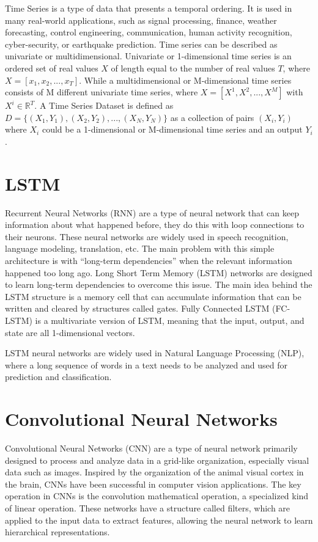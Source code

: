Time Series is a type of data that presents a temporal ordering. It is used in many real-world applications, such as signal processing, finance, weather forecasting, control engineering, communication, human activity recognition, cyber-security, or earthquake prediction. Time series can be described as univariate or multidimensional. Univariate or 1-dimensional time series is an ordered set of real values $X$ of length equal to the number of real values $T$, where $X = [x_1, x_2, ..., x_T]$. While a multidimensional or M-dimensional time series consists of M different univariate time series, where $X = [X^1, X^2, ..., X^M]$ with $X^i \in \mathbb{R}^T$. A Time Series Dataset is defined as $D = \{(X_1, Y_1), (X_2, Y_2), ..., (X_N, Y_N)\}$ as a collection of pairs $(X_i, Y_i)$ where $X_i$ could be a 1-dimensional or M-dimensional time series and an output $Y_i$.

\section{LSTM}
\label{sec:LSTM} 

Recurrent Neural Networks (RNN) are a type of neural network that can keep information about what happened before, they do this with loop connections to their neurons. These neural networks are widely used in speech recognition, language modeling, translation, etc. The main problem with this simple architecture is with “long-term dependencies” when the relevant information happened too long ago. Long Short Term Memory (LSTM) networks are designed to learn long-term dependencies to overcome this issue. The main idea behind the LSTM structure is a memory cell that can accumulate information that can be written and cleared by structures called gates. Fully Connected LSTM (FC-LSTM) is a multivariate version of LSTM, meaning that the input, output, and state are all 1-dimensional vectors.

LSTM neural networks are widely used in Natural Language Processing (NLP), where a long sequence of words in a text needs to be analyzed and used for prediction and classification.

\section{Convolutional Neural Networks}
\label{sec:CNN}

Convolutional Neural Networks (CNN) are a type of neural network primarily designed to process and analyze data in a grid-like organization, especially visual data such as images. Inspired by the organization of the animal visual cortex in the brain, CNNs have been successful in computer vision applications. The key operation in CNNs is the convolution mathematical operation, a specialized kind of linear operation. These networks have a structure called filters, which are applied to the input data to extract features, allowing the neural network to learn hierarchical representations.

